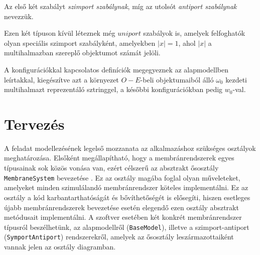 Az első két szabályt \textit{szimport szabálynak}, míg az utolsót \textit{antiport szabálynak} nevezzük.

\begin{note}
Ezen két típuson kívül léteznek még $uniport$ szabályok is, amelyek felfoghatók olyan speciális szimport szabályként, amelyekben $|x| = 1$, ahol $|x|$ a multihalmazban szereplő objektumot számát jelöli.
\end{note}

A konfigurációkkal kapcsolatos definíciók megegyeznek az alapmodellben leírtakkal, kiegészítve azt a környezet $O-E$-beli objektumaiból álló $\omega_0$ kezdeti multihalmazt reprezentáló sztringgel, a későbbi konfigurációkban pedig $w_0$-val.


\section{Tervezés}

A feladat modellezésének legelső mozzanata az alkalmazáshoz szükséges osztályok meghatározása. Elsőként megállapítható, hogy a membránrendszerek egyes típusainak sok közös vonása van, ezért célszerű az absztrakt ősosztály \verb|MembraneSystem| bevezetése . Ez az osztály magába foglal olyan műveleteket, amelyeket minden szimulálandó membránrendszer köteles implementálni. Ez az osztály a kód karbantarthatóságát és bővíthetőségét is elősegíti, hiszen esetleges újabb membránrendszerek bevezetése esetén elegendő ezen osztály absztrakt metódusait implementálni. A szoftver esetében két konkrét membránrendszer típusról beszélhetünk, az alapmodellről (\verb|BaseModel|), illetve a szimport-antiport (\verb|SymportAntiport|)  rendszerekről, amelyek az ősosztály leszármazottaiként vannak jelen az osztály diagramban. 


